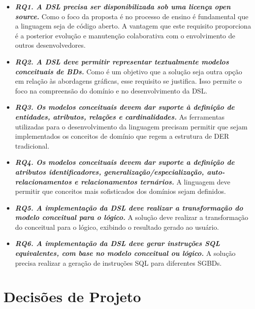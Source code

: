 \begin{itemize}

\item\textit{\textbf{RQ1. A \ac{DSL} precisa ser disponibilizada sob uma licença open source.}} 
Como o foco da proposta é no processo de ensino é fundamental que a linguagem seja de código aberto. 
A vantagem que este requisito proporciona é a posterior evolução e manutenção colaborativa com o envolvimento de outros desenvolvedores.

\item\textit{\textbf{RQ2. A \ac{DSL} deve permitir representar textualmente modelos conceituais de \acp{BD}.}} 
Como é um objetivo que a solução seja outra opção em relação às abordagens gráficas, esse requisito se justifica. 
Isso permite o foco na compreensão do domínio e no desenvolvimento da \ac{DSL}.

\item\textit{\textbf{RQ3. Os modelos conceituais devem dar suporte à definição de entidades, atributos, relações e cardinalidades.}} 
As ferramentas utilizadas para o desenvolvimento da linguagem precisam permitir que sejam implementados os conceitos de domínio que regem a estrutura de \ac{DER} tradicional.

\item\textit{\textbf{RQ4. Os modelos conceituais devem dar suporte a definição de atributos identificadores, generalização/especialização, auto-relacionamentos e relacionamentos ternários.}} 
A linguagem deve permitir que conceitos mais sofisticados dos domínios sejam definidos.

\item\textit{\textbf{RQ5. A implementação da \ac{DSL} deve realizar a transformação do modelo conceitual para o lógico.}} 
A solução deve realizar a transformação do conceitual para o lógico, exibindo o resultado gerado ao usuário.

\item\textit{\textbf{RQ6. A implementação da \ac{DSL} deve gerar instruções \ac{SQL} equivalentes, com base no modelo conceitual ou lógico.}} 
A solução precisa realizar a geração de instruções \ac{SQL} para diferentes \acp{SGBD}.

\end{itemize}

\section{Decisões de Projeto} \label{sec:decDSL}

